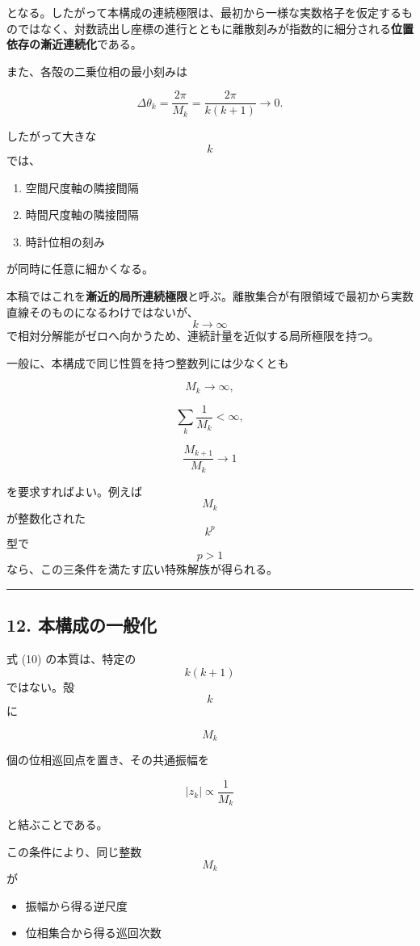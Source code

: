 \documentclass[
  a4paper,
]{ltjsarticle}
\providecommand{\tightlist}{%
  \setlength{\itemsep}{0pt}\setlength{\parskip}{0pt}}
\begin{document}
となる。したがって本構成の連続極限は、最初から一様な実数格子を仮定するものではなく、対数読出し座標の進行とともに離散刻みが指数的に細分される\textbf{位置依存の漸近連続化}である。

また、各殻の二乗位相の最小刻みは

\[
\Delta\theta_k
=
\frac{2\pi}{M_k}
=
\frac{2\pi}{k(k+1)}
\longrightarrow0.
\tag{47}
\]

したがって大きな \[k\] では、

\begin{enumerate}
\def\labelenumi{\arabic{enumi}.}
\tightlist
\item
  空間尺度軸の隣接間隔
\item
  時間尺度軸の隣接間隔
\item
  時計位相の刻み
\end{enumerate}

が同時に任意に細かくなる。

本稿ではこれを\textbf{漸近的局所連続極限}と呼ぶ。離散集合が有限領域で最初から実数直線そのものになるわけではないが、\[k\to\infty\]
で相対分解能がゼロへ向かうため、連続計量を近似する局所極限を持つ。

一般に、本構成で同じ性質を持つ整数列には少なくとも

\[
M_k\to\infty,
\]

\[
\sum_k\frac{1}{M_k}<\infty,
\]

\[
\frac{M_{k+1}}{M_k}\to1
\tag{48}
\]

を要求すればよい。例えば \[M_k\] が整数化された \[k^p\] 型で \[p>1\]
なら、この三条件を満たす広い特殊解族が得られる。

\begin{center}\rule{0.5\linewidth}{0.5pt}\end{center}

\subsection{12.
本構成の一般化}\label{ux672cux69cbux6210ux306eux4e00ux822cux5316}

式 (10) の本質は、特定の \[k(k+1)\] ではない。殻 \[k\] に

\[
M_k
\]

個の位相巡回点を置き、その共通振幅を

\[
|z_k|
\propto
\frac{1}{M_k}
\tag{49}
\]

と結ぶことである。

この条件により、同じ整数 \[M_k\] が

\begin{itemize}
\tightlist
\item
  振幅から得る逆尺度
\item
  位相集合から得る巡回次数
\end{itemize}
\end{document}
